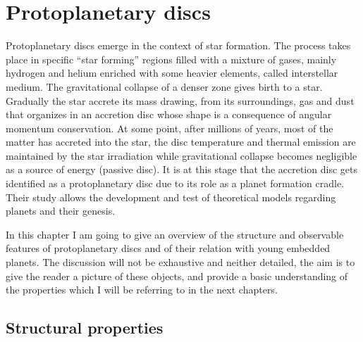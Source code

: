 \documentclass[a4paper,10pt]{report}
\begin{document}
\chapter{Protoplanetary discs}

Protoplanetary discs emerge in the context of star formation. 
The process takes place in specific ``star forming'' regions filled with a mixture of gases, mainly hydrogen and helium enriched with some
heavier elements, called interstellar medium. The gravitational collapse of a denser zone gives birth to a star. Gradually the star
accrete its mass drawing, from its surroundings, gas and dust that organizes in an accretion disc whose shape is a consequence of angular momentum conservation.
At some point, after millions of years, most of the matter has accreted into the star,
the disc temperature and thermal emission are maintained by the star irradiation while gravitational collapse becomes negligible as a source of energy (passive disc). 
It is at this stage that the accretion disc gets identified
as a protoplanetary disc due to its role as a planet formation cradle.
Their study allows the development and test of theoretical models regarding planets and their genesis.

In this chapter I am going to give an overview of the structure and observable features
of protoplanetary discs and of their relation with young embedded planets. The discussion will not be
exhaustive and neither detailed, the aim is to give
the reader a picture of these objects, and provide a basic understanding of the 
properties which I will be referring to in the next chapters.

\section{Structural properties}
\end{document}
